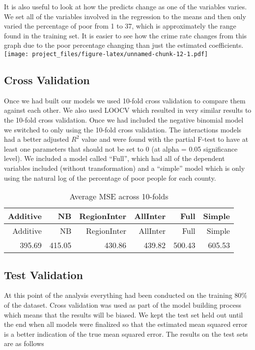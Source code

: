 \documentclass[]{article}
\begin{document}
It is also useful to look at how the predicts change as one of the
variables varies. We set all of the variables involved in the regression
to the means and then only varied the percentage of poor from 1 to 37,
which is approximately the range found in the training set. It is easier
to see how the crime rate changes from this graph due to the poor
percentage changing than just the estimated coefficients.
\texttt{[image: project\_files/figure-latex/unnamed-chunk-12-1.pdf]}

\subsection{Cross Validation}\label{cross-validation}

Once we had built our models we used 10-fold cross validation to compare
them against each other. We also used LOOCV which resulted in very
similar results to the 10-fold cross validation. Once we had included
the negative binomial model we switched to only using the 10-fold cross
validation. The interactions models had a better adjusted \(R^2\) value
and were found with the partial F-test to have at least one parameters
that should not be set to 0 (at alpha = 0.05 significance level). We
included a model called ``Full'', which had all of the dependent
variables included (without transformation) and a ``simple'' model which
is only using the natural log of the percentage of poor people for each
county.

\begin{longtable}[]{@{}rrrrrr@{}}
\caption{Average MSE across 10-folds}\tabularnewline
\toprule
Additive & NB & RegionInter & AllInter & Full & Simple\tabularnewline
\midrule
\endfirsthead
\toprule
Additive & NB & RegionInter & AllInter & Full & Simple\tabularnewline
\midrule
\endhead
395.69 & 415.05 & 430.86 & 439.82 & 500.43 & 605.53\tabularnewline
\bottomrule
\end{longtable}

\subsection{Test Validation}\label{test-validation}

At this point of the analysis everything had been conducted on the
training 80\% of the dataset. Cross validation was used as part of the
model building process which means that the results will be biased. We
kept the test set held out until the end when all models were finalized
so that the estimated mean squared error is a better indication of the
true mean squared error. The results on the test sets are as follows
\end{document}
